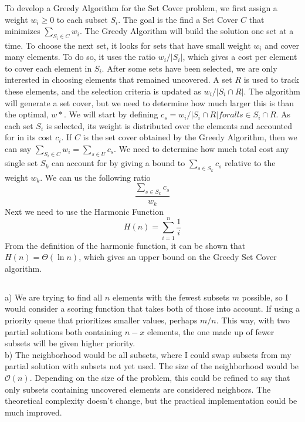 \documentclass{article}
\begin{document}
To develop a Greedy Algorithm for the Set Cover problem, we first assign a weight $w_i \geq 0$ to each subset $S_i$. The goal is the find a Set Cover $C$ that minimizes $\sum_{S_i \in C} w_i$. The Greedy Algorithm will build the solution one set at a time. To choose the next set, it looks for sets that have small weight $w_i$ and cover many elements. To do so, it uses the ratio $w_i/|S_i|$, which gives a cost per element to cover each element in $S_i$. After some sets have been selected, we are only interested in choosing elements that remained uncovered. A set $R$ is used to track these elements, and the selection criteria is updated as $w_i/|S_i \cap R|$. The algorithm will generate a set cover, but we need to determine how much larger this is than the optimal, $w*$. We will start by defining $c_s = w_i/|S_i \cap R| for all s \in S_i \cap R$. As each set $S_i$ is selected, its weight is distributed over the elements and accounted for in its cost $c_i$. If $C$ is the set cover obtained by the Greedy Algorithm, then we can say $\sum_{S_i \in C} w_i = \sum_{s \in U} c_s$. We need to determine how much total cost any single set $S_k$ can account for by giving a bound to $\sum_{s \in S_k} c_s$ relative to the weight $w_k$. We can us the following ratio $$\frac{\sum_{s \in S_k} c_s}{w_k}$$ Next we need to use the Harmonic Function $$H(n)=\sum_{i=1}^{n} \frac{1}{i}$$ From the definition of the harmonic function, it can be shown that $H(n)=\Theta(\ln n)$, which gives an upper bound on the Greedy Set Cover algorithm.

\subsection{}

a) We are trying to find all $n$ elements with the fewest subsets $m$ possible, so I would consider a scoring function that takes both of those into account. If using a priority queue that prioritizes smaller values, perhaps $m / n$. This way, with two partial solutions both containing $n-x$ elements, the one made up of fewer subsets will be given higher priority.\\

b) The neighborhood would be all subsets, where I could swap subsets from my partial solution with subsets not yet used. The size of the neighborhood would be $\mathcal{O}(n)$. Depending on the size of the problem, this could be refined to say that only subsets containing uncovered elements are considered neighbors. The theoretical complexity doesn't change, but the practical implementation could be much improved.\\
\end{document}
